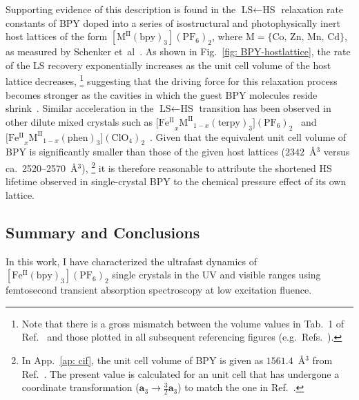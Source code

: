 Supporting evidence of this description is found
in the $\text{LS} \leftarrow \text{HS}$ relaxation rate constants of
BPY doped into a series of isostructural and photophysically inert host lattices
of the form $\mathrm{[M^{II}(bpy)_3](PF_6)_2}$,
where $\text{M} = \{ \text{Co, Zn, Mn, Cd} \}$,
as measured by Schenker et~al~\cite{Schenker1998}.
%
As shown in Fig.~\ref{fig: BPY-hostlattice},
the rate of the LS recovery exponentially increases
as the unit cell volume of the host lattice decreases,%
\footnote{Note that there is a gross mismatch between the volume values
in Tab.~1 of Ref.~\cite{Schenker1998} and those plotted in all subsequent referencing figures
(e.g.~Refs.~\cite{Hauser2002, Hauser2004, SCO-II, Hauser2006}).}
suggesting that the driving force for this relaxation process becomes stronger
as the cavities in which the guest BPY molecules reside shrink~\cite{Hauser2004, Hauser2006}.
%
Similar acceleration in the $\text{LS} \leftarrow \text{HS}$ transition
has been observed in other dilute mixed crystals such as
$\mathrm{[Fe^{II}}_x \mathrm{M^{II}}_{1 - x} \mathrm{(terpy)_3] (PF_6)_2}$~\cite{Hauser2006}
and $\mathrm{[Fe^{II}}_x \mathrm{M^{II}}_{1 - x} \mathrm{(phen)_3] (ClO_4)_2}$~\cite{Bode1980}.
%
Given that the equivalent unit cell volume of BPY is significantly smaller than
those of the given host lattices ($2342$~\AA{}$^3$ versus ca.~2520--2570~\AA{}$^3$),%
\footnote{In App.~\ref{ap: cif}, the unit cell volume of BPY is given as $1561.4$~\AA{}$^3$
from Ref.~\cite{Dick1998}. The present value is calculated for an unit cell
that has undergone a coordinate transformation
($\boldsymbol{a}_3 \rightarrow \frac{3}{2}  \boldsymbol{a}_3$)
to match the one in Ref.~\cite{Schenker1998}.}
it is therefore reasonable to attribute the shortened HS lifetime observed in single-crystal BPY
to the chemical pressure effect of its own lattice.

\subsection{Summary and Conclusions}

In this work, I have characterized the ultrafast dynamics of $\mathrm{[Fe^{II}(bpy)_3](PF_6)_2}$
single crystals in the UV and visible ranges using femtosecond transient absorption spectroscopy
at low excitation fluence.

